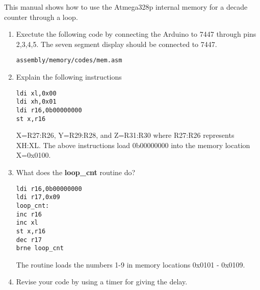 This manual shows how to use the Atmega328p internal memory for a decade counter through a loop.
\begin{enumerate}[label=\arabic*.,ref=\theenumi]
\item Exectute the following code by connecting the Arduino to 7447 through pins 2,3,4,5. The seven segment display should be connected to 7447.
\begin{lstlisting}
assembly/memory/codes/mem.asm
\end{lstlisting}
\item Explain the following instructions
\begin{lstlisting}
ldi xl,0x00
ldi xh,0x01
ldi r16,0b00000000
st x,r16
\end{lstlisting}
\solution X=R27:R26, Y=R29:R28, and Z=R31:R30 where R27:R26 represents XH:XL. The above instructions load 0b00000000 into
the memory location X=0x0100.
\item What does the \textbf{loop\_cnt} routine do?
\begin{lstlisting}
ldi r16,0b00000000
ldi r17,0x09
loop_cnt:
inc r16
inc xl
st x,r16
dec r17
brne loop_cnt
\end{lstlisting}
\solution The routine loads the numbers 1-9 in memory locations 0x0101 - 0x0109.

\item Revise your code by using a timer for giving the delay.
\end{enumerate}


